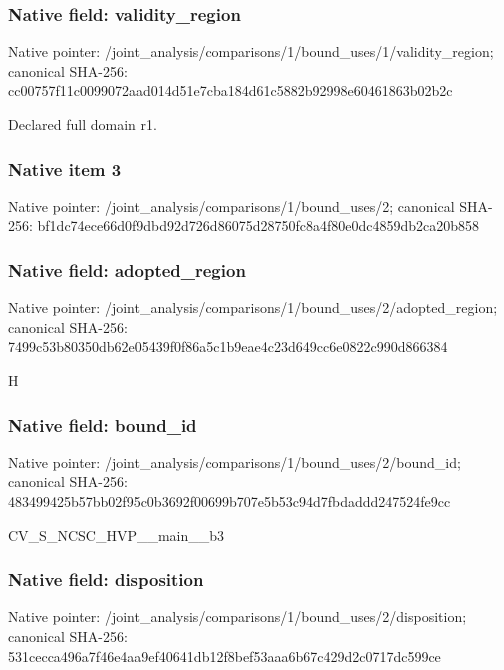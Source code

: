 \documentclass[10pt,a4paper]{article}
\begin{document}
\subsubsection{Native field: validity\_\allowbreak{}region}
Native pointer: /joint\_\allowbreak{}analysis/comparisons/1/bound\_\allowbreak{}uses/1/validity\_\allowbreak{}region; canonical SHA-256: cc00757f11c0099072aad014d51e7cba184d61c5882b92998e60461863b02b2c

\begingroup\raggedright\sloppy Declared full domain r1.\par\endgroup

\subsubsection{Native item 3}
Native pointer: /joint\_\allowbreak{}analysis/comparisons/1/bound\_\allowbreak{}uses/2; canonical SHA-256: bf1dc74ece66d0f9dbd92d726d86075d28750fc8a4f80e0dc4859db2ca20b858

\subsubsection{Native field: adopted\_\allowbreak{}region}
Native pointer: /joint\_\allowbreak{}analysis/comparisons/1/bound\_\allowbreak{}uses/2/adopted\_\allowbreak{}region; canonical SHA-256: 7499c53b80350db62e05439f0f86a5c1b9eae4c23d649cc6e0822c990d866384

\begingroup\raggedright\sloppy H\par\endgroup

\subsubsection{Native field: bound\_\allowbreak{}id}
Native pointer: /joint\_\allowbreak{}analysis/comparisons/1/bound\_\allowbreak{}uses/2/bound\_\allowbreak{}id; canonical SHA-256: 483499425b57bb02f95c0b3692f00699b707e5b53c94d7fbdaddd247524fe9cc

\begingroup\raggedright\sloppy CV\_\allowbreak{}S\_\allowbreak{}NCSC\_\allowbreak{}HVP\_\allowbreak{}\_\allowbreak{}main\_\allowbreak{}\_\allowbreak{}b3\par\endgroup

\subsubsection{Native field: disposition}
Native pointer: /joint\_\allowbreak{}analysis/comparisons/1/bound\_\allowbreak{}uses/2/disposition; canonical SHA-256: 531cecca496a7f46e4aa9ef40641db12f8bef53aaa6b67c429d2c0717dc599ce
\end{document}
